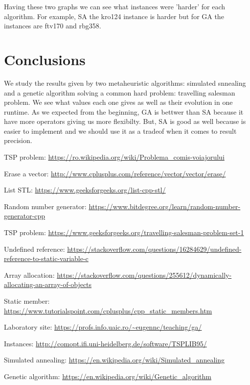 \documentclass[12pt,leqno]{article}
\begin{document}
Having these two graphs we can see what instances were 'harder' for each algorithm. For example, SA the kro124 instance is harder
but for GA the instances are ftv170 and rbg358.

\pagebreak

\section{Conclusions}
  We study the results given by two metaheuristic algorithms: simulated snnealing and a genetic algorithm solving a common
  hard problem: travelling salesman problem. We see what values each one gives as well as their evolution in one runtime.
  As we expected from the beginning, GA is bettwer than SA because it have more operators giving us more flexibilty. But, SA is good
  as well because is easier to implement and we should use it as a tradeof when it comes to result precision.


\begin{thebibliography}{9}
  \bibitem{}
    TSP problem: 
    \url{https://ro.wikipedia.org/wiki/Problema_comis-voiajorului}
    \bibitem{}

    Erase a vector: 
    \url{http://www.cplusplus.com/reference/vector/vector/erase/}
    \bibitem{}

    List STL: 
    \url{https://www.geeksforgeeks.org/list-cpp-stl/}
    \bibitem{}

    Random number generator: 
    \url{https://www.bitdegree.org/learn/random-number-generator-cpp}
    \bibitem{}

    TSP problem: 
    \url{https://www.geeksforgeeks.org/travelling-salesman-problem-set-1}
    \bibitem{}

    Undefined reference: 
    \url{https://stackoverflow.com/questions/16284629/undefined-reference-to-static-variable-c}
    \bibitem{}

    Array allocation: 
    \url{https://stackoverflow.com/questions/255612/dynamically-allocating-an-array-of-objects}
    \bibitem{}

    Static member: 
    \url{https://www.tutorialspoint.com/cplusplus/cpp_static_members.htm}
  \bibitem{}
    
    Laboratory site: 
    \url{https://profs.info.uaic.ro/~eugennc/teaching/ga/}
    \bibitem{}

    Instances: 
    \url{http://comopt.ifi.uni-heidelberg.de/software/TSPLIB95/}
    \bibitem{}

    Simulated annealing: 
    \url{https://en.wikipedia.org/wiki/Simulated_annealing}
    \bibitem{}

    Genetic algorithm: 
    \url{https://en.wikipedia.org/wiki/Genetic_algorithm}

  \end{thebibliography}  
  
\end{document}
